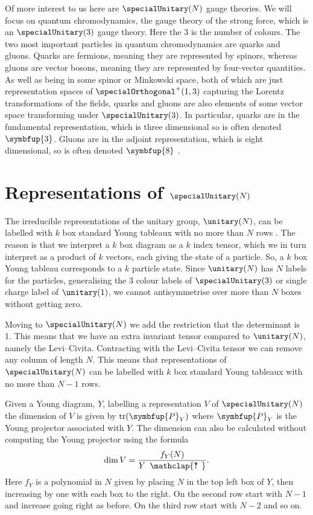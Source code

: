 \documentclass[fleqn]{NotesClass}
\newcommand{\projector}[1]{\symbfup{P}_{#1}}
\newcommand{\hooknumber}[1]{#1{\phantom{?}\mkern1mu\mathclap{\ooalign{\hfil ? \hfil \cr \hfil ! \hfil}}}}
\DeclareMathOperator{\tr}{tr}
\newcommand{\rep}[1]{\symbfup{#1}}
\begin{document}
    Of more interest to us here are \(\specialUnitary(N)\) gauge theories.
    We will focus on quantum chromodynamics, the gauge theory of the strong force, which is an \(\specialUnitary(3)\) gauge theory.
    Here the 3 is the number of colours.
    The two most important particles in quantum chromodynamics are quarks and gluons.
    Quarks are fermions, meaning they are represented by spinors, whereas gluons are vector bosons, meaning they are represented by four-vector quantities.
    As well as being in some spinor or Minkowski space, both of which are just representation spaces of \(\specialOrthogonal^+(1, 3)\) capturing the Lorentz transformations of the fields, quarks and gluons are also elements of some vector space transforming under \(\specialUnitary(3)\).
    In particular, quarks are in the fundamental representation, which is three dimensional so is often denoted \(\rep{3}\).
    Gluons are in the adjoint representation, which is eight dimensional, so is often denoted \(\rep{8}\) \cite{peskin}.
    
    \section{Representations of \texorpdfstring{\(\specialUnitary(N)\)}{SU(N)}}
    The irreducible representations of the unitary group, \(\unitary(N)\), can be labelled with \(k\) box standard Young tableaux with no more than \(N\) rows \cite[87]{cvitanovic}.
    The reason is that we interpret a \(k\) box diagram as a \(k\) index tensor, which we in turn interpret as a product of \(k\) vectors, each giving the state of a particle.
    So, a \(k\) box Young tableau corresponds to a \(k\) particle state.
    Since \(\unitary(N)\) has \(N\) labels for the particles, generalising the 3 colour labels of \(\specialUnitary(3)\) or single charge label of \(\unitary(1)\), we cannot antisymmetrise over more than \(N\) boxes without getting zero.
    
    Moving to \(\specialUnitary(N)\) we add the restriction that the determinant is 1.
    This means that we have an extra invariant tensor compared to \(\unitary(N)\), namely the Levi--Civita.
    Contracting with the Levi--Civita tensor we can remove any column of length \(N\).
    This means that representations of \(\specialUnitary(N)\) can be labelled with \(k\) box standard Young tableaux with no more than \(N - 1\) rows.
    
    Given a Young diagram, \(Y\), labelling a representation \(V\) of \(\specialUnitary(N)\) the dimension of \(V\) is given by \(\tr(\projector{Y})\) where \(\projector{Y}\) is the Young projector associated with \(Y\).
    The dimension can also be calculated without computing the Young projector using the formula
    \begin{equation}\label{eqn:dim of SU N rep}
        \dim V = \frac{f_Y(N)}{\hooknumber{Y}}.
    \end{equation}
    Here \(f_Y\) is a polynomial in \(N\) given by placing \(N\) in the top left box of \(Y\), then increasing by one with each box to the right.
    On the second row start with \(N - 1\) and increase going right as before.
    On the third row start with \(N - 2\) and so on.
    
\end{document}
